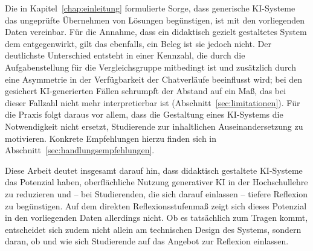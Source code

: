 Die in Kapitel~\ref{chap:einleitung} formulierte Sorge, dass generische KI-Systeme das ungeprüfte
Übernehmen von Lösungen begünstigen, ist mit den vorliegenden Daten vereinbar. Für die Annahme, dass
ein didaktisch gezielt gestaltetes System dem entgegenwirkt, gilt das ebenfalls, ein Beleg ist sie
jedoch nicht. Der deutlichste Unterschied entsteht in einer Kennzahl, die durch die Aufgabenstellung
für die Vergleichsgruppe mitbedingt ist und zusätzlich durch eine Asymmetrie in der Verfügbarkeit der
Chatverläufe beeinflusst wird; bei den gesichert KI-generierten Fällen schrumpft der Abstand auf ein
Maß, das bei dieser Fallzahl nicht mehr interpretierbar ist (Abschnitt~\ref{sec:limitationen}). Für
die Praxis folgt daraus vor allem, dass die Gestaltung eines KI-Systems die Notwendigkeit nicht
ersetzt, Studierende zur inhaltlichen Auseinandersetzung zu motivieren. Konkrete Empfehlungen hierzu
finden sich in Abschnitt~\ref{sec:handlungsempfehlungen}.

Diese Arbeit deutet insgesamt darauf hin, dass didaktisch gestaltete KI-Systeme das Potenzial haben,
oberflächliche Nutzung generativer KI in der Hochschullehre zu reduzieren und -- bei Studierenden, die
sich darauf einlassen -- tiefere Reflexion zu begünstigen. Auf dem direkten Reflexionsstufenmaß zeigt
sich dieses Potenzial in den vorliegenden Daten allerdings nicht. Ob es tatsächlich zum Tragen kommt,
entscheidet sich zudem nicht allein am technischen Design des Systems, sondern daran, ob und wie sich
Studierende auf das Angebot zur Reflexion einlassen.
